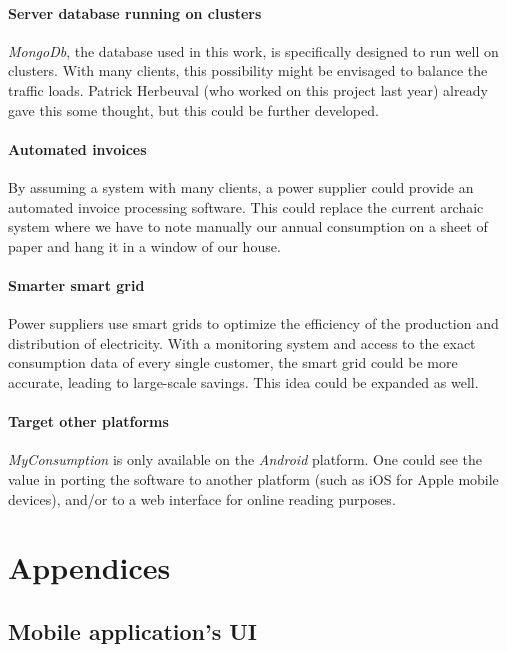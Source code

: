 \documentclass[a4paper, oneside, 11pt]{book}
\newcommand\partcontent{}
\begin{document}
\subsection{Server database running on clusters}
\textit{MongoDb}, the database used in this work, is specifically designed to run well on clusters. With many clients, this possibility might be envisaged to balance the traffic loads. Patrick Herbeuval (who worked on this project last year) already gave this some thought, but this could be further developed.

\subsection{Automated invoices}
By assuming a system with many clients, a power supplier could provide an automated invoice processing software. This could replace the current archaic system where we have to note manually our annual consumption on a sheet of paper and hang it in a window of our house.

\subsection{Smarter smart grid}
Power suppliers use smart grids to optimize the efficiency of the production and distribution of electricity.  With a monitoring system and access to the exact consumption data of every single customer, the smart grid could be more accurate, leading to large-scale savings. This idea could be expanded as well.

\subsection{Target other platforms}
\textit{MyConsumption} is only available on the \textit{Android} platform. One could see the value in porting the software to another platform (such as iOS for Apple mobile devices), and/or to a web interface for online reading purposes.
 



\part{Appendices}
\renewcommand\partcontent{APPENDICES: }

\chapter{Mobile application's UI}
\end{document}

